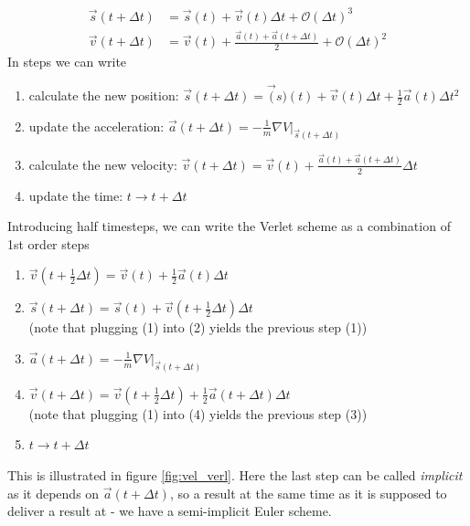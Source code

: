 \begin{equation}
  \begin{aligned}
    \vec{s}(t+\Delta t) &= \vec{s}(t) + \vec{v}(t) \Delta t + \mathcal{O}(\Delta t)^3 \\
    \vec{v}(t+\Delta t) &= \vec{v}(t) + \frac{\vec{a}(t) + \vec{a}(t + \Delta t)}{2} + \mathcal{O}(\Delta t)^2
  \end{aligned}
\end{equation}
In steps we can write
\begin{enumerate}
  \item calculate the new position: $\vec{s}(t+\Delta t) = \vec(s)(t) + \vec{v}(t)\Delta t + \frac{1}{2} \vec{a}(t) \Delta t^2$
  \item update the acceleration: $\vec{a}(t+\Delta t) = -\frac{1}{m} \left. \nabla V \right|_{\vec{s}(t+\Delta t)}$
  \item calculate the new velocity: $\vec{v}(t+\Delta t) = \vec{v}(t) + \frac{\vec{a}(t) + \vec{a}(t+\Delta t)}{2} \Delta t$
  \item update the time: $t \rightarrow t + \Delta t$
\end{enumerate}
Introducing half timesteps, we can write the Verlet scheme as a combination of 1st order steps
\begin{enumerate}
  \item $\vec{v}\left( t + \frac{1}{2} \Delta t \right) = \vec{v}(t) + \frac{1}{2} \vec{a}(t) \Delta t$
  \item $\vec{s}(t + \Delta t) = \vec{s}(t) + \vec{v}\left( t + \frac{1}{2}\Delta t \right) \Delta t$\\(note that plugging (1) into (2) yields the previous step (1))
  \item $\vec{a}(t+\Delta t) = -\frac{1}{m} \left. \nabla V \right|_{\vec{s}(t+\Delta t)}$
  \item $\vec{v}\left( t + \Delta t \right) = \vec{v}\left( t + \frac{1}{2} \Delta t \right) + \frac{1}{2} \vec{a}(t+\Delta t) \Delta t$\\(note that plugging (1) into (4) yields the previous step (3))
  \item $t \rightarrow t + \Delta t$
\end{enumerate}
This is illustrated in figure \ref{fig:vel_verl}. Here the last step can be called \textit{implicit} as it depends on $\vec{a}(t+\Delta t)$, so a result at the same time as it is supposed
to deliver a result at - we have a semi-implicit Euler scheme.

